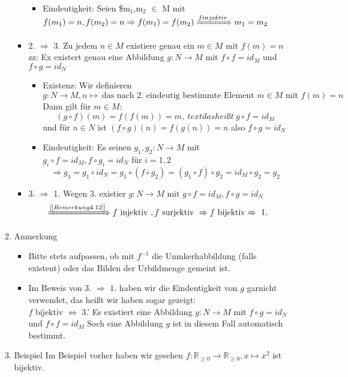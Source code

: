 \documentclass[11pt]{article}
\begin{document}
\begin{enumerate}
\begin{enumerate}
\begin{itemize}
\begin{itemize}
\item Eindeutigkeit: Seien \$m$_{\text{1}}$,m$_{\text{2}}$ $\in$ M  mit \(f(m_1) = n, f(m_2) = n \Rightarrow f(m_1) = f(m_2) \xRightarrow{f injektiv} m_1 = m_2\)
\end{itemize}
\item 2. $\Rightarrow$ 3. Zu jedem $n\in M$ existiere genau ein $m\in M$ mit $f(m) = n$ \\
        zz: Ex existert genau eine Abbildung $g:N\to M$ mit $f\circ f = id_M$ und $f\circ g = id_N$
\begin{itemize}
\item Existenz: Wir definieren \(g:N\to M, n\mapsto~\text{das nach 2. eindeutig bestimmte Element $m\in M$ mit $f(m) = n$}\) \\
          Dann gilt für $m\in M$: \[(g\circ f)(m) = f(f(m)) = m,~text{das heißt}~ g\circ f = id_M\]
          und für $n\in N$ ist $(f\circ g)(n) = f(g(n)) = n$ also $f\circ g = id_N$
\item Eindeutigkeit: Es seinen $g_1,g_2:N\to M$ mit $g_i \circ f = id_M, f\circ g_i = id_N$ für $i = 1,2$ \\
          \[\Rightarrow g_1 = g_1 \circ id_N = g_1 \circ (f\circ g_2) = (g_1 \circ f) \circ g_2 = id_M \circ g_2 = g_2\]
\end{itemize}
\item 3. $\Rightarrow$ 1. Wegen 3. existier $g:N\to M$ mit $g\circ f = id_M,f\circ g = id_N$ \\
        \[\xRightarrow{[[Bemerkung 4.12]]} f~\text{injektiv}~,f~\text{surjektiv}~\Rightarrow f~\text{bijektiv}\Rightarrow~\text{1.}\]
\end{itemize}
\item Anmerkung
\label{sec-2-6-7-6-2}
\begin{itemize}
\item Bitte stets aufpassen, ob mit $f^{-1}$ die Unmkerhabbildung (falls existent) oder das Bilden der Urbildmenge gemeint ist.
\item Im Beweis von 3. $\Rightarrow$ 1. haben wir die Eindeutigkeit von $g$ garnicht verwendet, das heißt wir haben sogar gezeigt: \\
        $f$ bijektiv $\Leftrightarrow$ 3.' Es existiert eine Abbildung $g:N\to M$ mit $f\circ g = id_N$ und $f\circ f = id_M$ Soch eine Abbildung $g$ ist in diesem Fall automatisch bestimmt.
\end{itemize}
\item Beispiel
\label{sec-2-6-7-6-3}
Im Beispiel vorher haben wir gesehen $f:\mathbb{R}_{\geq 0} \to \mathbb{R}_{\geq 0}, x\mapsto x^2$ ist bijektiv.

\end{enumerate}
\end{enumerate}
\end{document}
